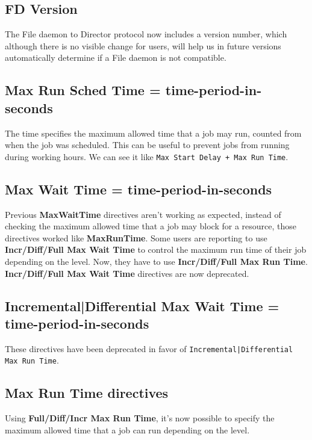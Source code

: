 \subsection{FD Version}
The File daemon to Director protocol now includes a version 
number, which although there is no visible change for users, 
will help us in future versions automatically determine
if a File daemon is not compatible.

\subsection{Max Run Sched Time = \lt{}time-period-in-seconds\gt{}}
The time specifies the maximum allowed time that a job may run, counted from
when the job was scheduled. This can be useful to prevent jobs from running
during working hours. We can see it like \texttt{Max Start Delay + Max Run
  Time}.

\subsection{Max Wait Time = \lt{}time-period-in-seconds\gt{}}
Previous \textbf{MaxWaitTime} directives aren't working as expected, instead
of checking the maximum allowed time that a job may block for a resource,
those directives worked like \textbf{MaxRunTime}. Some users are reporting to
use \textbf{Incr/Diff/Full Max Wait Time} to control the maximum run time of
their job depending on the level. Now, they have to use
\textbf{Incr/Diff/Full Max Run Time}.  \textbf{Incr/Diff/Full Max Wait Time}
directives are now deprecated.

\subsection{Incremental|Differential Max Wait Time = \lt{}time-period-in-seconds\gt{}} 

These directives have been deprecated in favor of
\texttt{Incremental|Differential Max Run Time}.

\subsection{Max Run Time directives}
Using \textbf{Full/Diff/Incr Max Run Time}, it's now possible to specify the
maximum allowed time that a job can run depending on the level.

